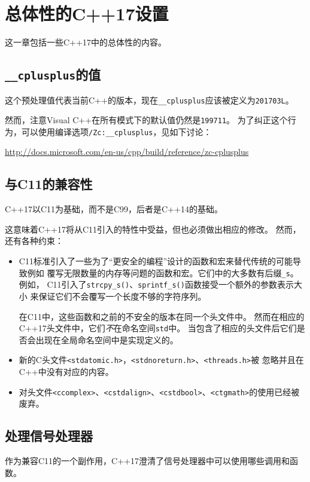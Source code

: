 \chapter{总体性的C++17设置}\label{ch34}
这一章包括一些C++17中的总体性的内容。


\section{\texttt{\_\_cplusplus}的值}
这个预处理值代表当前C++的版本，现在\texttt{\_\_cplusplus}应该被定义为\texttt{201703L}。

然而，注意Visual C++在所有模式下的默认值仍然是\texttt{199711}。
为了纠正这个行为，可以使用编译选项\texttt{/Zc:\_\_cplusplus}，见如下讨论：

\url{http://docs.microsoft.com/en-us/cpp/build/reference/zc-cplusplus}


\section{与C11的兼容性}
C++17以C11为基础，而不是C99，后者是C++14的基础。

这意味着C++17将从C11引入的特性中受益，但也必须做出相应的修改。
然而，还有各种约束：
\begin{itemize}
    \item C11标准引入了一些为了“更安全的编程”设计的函数和宏来替代传统的可能导致例如
    覆写无限数量的内存等问题的函数和宏。它们中的大多数有后缀\texttt{\_s}。例如，
    C11引入了\texttt{strcpy\_s()}、\texttt{sprintf\_s()}函数接受一个额外的参数表示大小
    来保证它们不会覆写一个长度不够的字符序列。

    在C11中，这些函数和之前的不安全的版本在同一个头文件中。
    然而在相应的C++17头文件中，它们\emph{不}在命名空间\texttt{std}中。
    当包含了相应的头文件后它们是否会出现在全局命名空间中是实现定义的。
    \item 新的C头文件\texttt{<stdatomic.h>}，\texttt{<stdnoreturn.h>}、\texttt{<threads.h>}被
    忽略并且在C++中没有对应的内容。
    \item 对头文件\texttt{<ccomplex>}、\texttt{<cstdalign>}、\texttt{<cstdbool>}、\texttt{<ctgmath>}的使用已经被废弃。
\end{itemize}


\section{处理信号处理器}
作为兼容C11的一个副作用，C++17澄清了信号处理器中可以使用哪些调用和函数。

